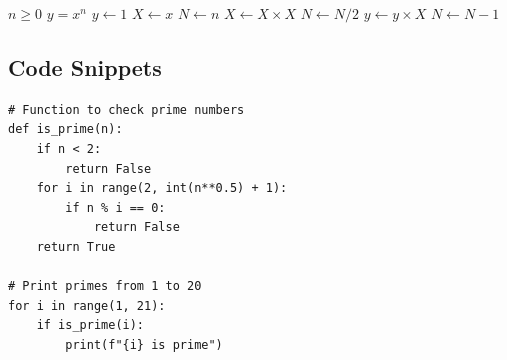 \documentclass[11pt]{article}
\begin{document}
\begin{algorithm}
\caption{An algorithm with caption}
\begin{algorithmic}
\Require $n \geq 0$
\Ensure $y = x^n$
\State $y \gets 1$
\State $X \gets x$
\State $N \gets n$
        \State $X \gets X \times X$
        \State $N \gets N/2$
    \Else
        \State $y \gets y \times X$
        \State $N \gets N - 1$
    \EndIf
\EndWhile
\end{algorithmic}
\end{algorithm}

\subsection{Code Snippets}

\begin{verbatim}
# Function to check prime numbers
def is_prime(n):
    if n < 2:
        return False
    for i in range(2, int(n**0.5) + 1):
        if n % i == 0:
            return False
    return True

# Print primes from 1 to 20
for i in range(1, 21):
    if is_prime(i):
        print(f"{i} is prime")
\end{verbatim}
\end{document}
